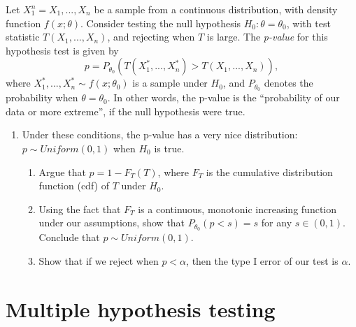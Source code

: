 \documentclass[11pt]{article}
\begin{document}
Let $X_1^n = X_1,...,X_n$ be a sample from a continuous distribution, with density function $f(x; \theta)$. Consider testing the null hypothesis $H_0: \theta = \theta_0$, with test statistic $T(X_1,...,X_n)$, and rejecting when $T$ is large. The \textit{p-value} for this hypothesis test is given by
$$p = P_{\theta_0}(T(X_1^*,...,X_n^*) > T(X_1,...,X_n)),$$
where $X_1^*,...,X_n^* \sim f(x; \theta_0)$ is a sample under $H_0$, and $P_{\theta_0}$ denotes the probability when $\theta = \theta_0$. In other words, the p-value is the ``probability of our data or more extreme'', if the null hypothesis were true.\\

\begin{enumerate}
\item Under these conditions, the p-value has a very nice distribution: $p \sim Uniform(0, 1)$ when $H_0$ is true.
\begin{enumerate}
\item Argue that $p = 1 - F_T(T)$, where $F_T$ is the cumulative distribution function (cdf) of $T$ under $H_0$.

\item Using the fact that $F_T$ is a continuous, monotonic increasing function under our assumptions, show that $P_{\theta_0}(p < s) = s$ for any $s \in (0, 1)$. Conclude that $p \sim Uniform(0, 1)$.

\item Show that if we reject when $p < \alpha$, then the type I error of our test is $\alpha$.
\end{enumerate}
\end{enumerate}

\section*{Multiple hypothesis testing}
\end{document}
